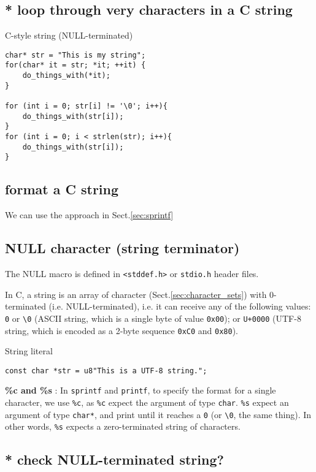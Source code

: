 \subsection{* loop through very characters in a C string}

C-style string (NULL-terminated)
\begin{verbatim}
char* str = "This is my string";
for(char* it = str; *it; ++it) {
    do_things_with(*it);
}

for (int i = 0; str[i] != '\0'; i++){
    do_things_with(str[i]);
}
for (int i = 0; i < strlen(str); i++){
    do_things_with(str[i]);
}

\end{verbatim}

\subsection{format a C string}
\label{sec:format-C-string}

We can use the approach in Sect.\ref{sec:sprintf}

\subsection{NULL character (string terminator)}
\label{sec:null-character}

The NULL macro is defined in \verb!<stddef.h>! or \verb!stdio.h! header files.

In C, a string is an array of character (Sect.\ref{sec:character_sets}) with
0-terminated (i.e. NULL-terminated), i.e. it can receive any of the following
values: \verb!0! or \verb!\0! (ASCII string, which is a single byte of value
\verb!0x00!); or \verb!U+0000! (UTF-8 string, which is encoded as a 2-byte
sequence \verb!0xC0! and \verb!0x80!).

String literal
\begin{verbatim}
const char *str = u8"This is a UTF-8 string.";
\end{verbatim}

{\bf \%c and \%s }: In \verb!sprintf! and \verb!printf!, to specify the format
for a single character, we use \verb!%c!, as \verb!%c! expect the argument
of type \verb!char!. \verb!%s! expect an argument of type \verb!char*!, and
print until it reaches a \verb!0! (or \verb!\0!, the same thing). In other
words, \verb!%s! expects a zero-terminated string of characters.

\subsection{* check NULL-terminated string?}

